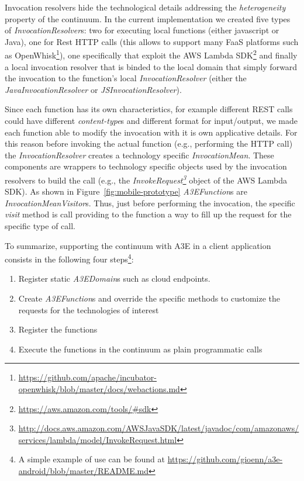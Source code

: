 Invocation resolvers hide the technological details addressing the \textit{heterogeneity} property of the continuum. In the current implementation we created five types of \textit{InvocationResolver}s: two for executing local functions (either javascript or Java), one for Rest HTTP calls (this allows to support many FaaS platforms such as OpenWhisk\footnote{\url{https://github.com/apache/incubator-openwhisk/blob/master/docs/webactions.md}}), one specifically that exploit the AWS Lambda SDK\footnote{\url{https://aws.amazon.com/tools/\#sdk}} and finally a local invocation resolver that is binded to the local domain that simply forward the invocation to the function's local \textit{InvocationResolver} (either the \textit{JavaInvocationResolver} or \textit{JSInvocationResolver}). 

Since each function has its own characteristics, for example different REST calls could have different \textit{content-type}s and different format for input/output, we made each function able to modify the invocation with it is own applicative details. For this reason before invoking the actual function (e.g., performing the HTTP call) the \textit{InvocationResolver} creates a technology specific \textit{InvocationMean}. These components are wrappers to technology specific objects used by the invocation resolvers to build the call (e.g., the \textit{InvokeRequest\footnote{\url{http://docs.aws.amazon.com/AWSJavaSDK/latest/javadoc/com/amazonaws/services/lambda/model/InvokeRequest.html}}} object of the AWS Lambda SDK). As shown in Figure~\ref{fig:mobile-prototype} \textit{A3EFunction}s are \textit{InvocationMeanVisitor}s. Thus, just before performing the invocation, the specific \textit{visit} method is call providing to the function a way to fill up the request for the specific type of call. 

To summarize, supporting the continuum with A3E in a client application consists in the following four steps\footnote{A simple example of use can be found at \url{https://github.com/gioenn/a3e-android/blob/master/README.md}}:

\begin{enumerate}
	\item Register static \textit{A3EDomain}s such as cloud endpoints.
	\item Create \textit{A3EFunction}s and override the specific methods to customize the requests for the technologies of interest
	\item Register the functions
	\item Execute the functions in the continuum as plain programmatic calls 
\end{enumerate}

